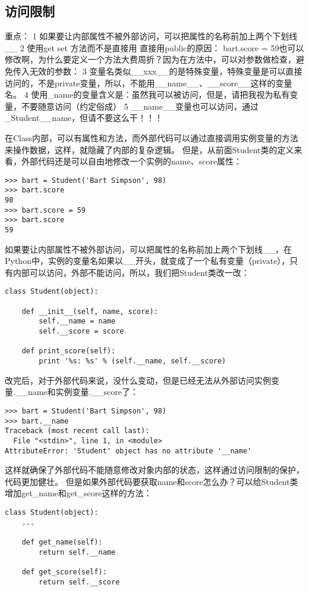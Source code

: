 \documentclass[twoside,11pt]{book}
\begin{document}
\subsection{访问限制}
重点：
1 如果要让内部属性不被外部访问，可以把属性的名称前加上两个下划线\_\_
2 使用get set 方法而不是直接用 直接用public的原因： bart.score = 59也可以修改啊，为什么要定义一个方法大费周折？因为在方法中，可以对参数做检查，避免传入无效的参数：
3 变量名类似\_\_xxx\_\_的是特殊变量，特殊变量是可以直接访问的，不是private变量，所以，不能用\_\_name\_\_、\_\_score\_\_这样的变量名。
4 使用\_name的变量含义是：虽然我可以被访问，但是，请把我视为私有变量，不要随意访问（约定俗成）
5 \_\_name\_\_变量也可以访问，通过\_Student\_\_name，但请不要这么干！！！


在Class内部，可以有属性和方法，而外部代码可以通过直接调用实例变量的方法来操作数据，这样，就隐藏了内部的复杂逻辑。
但是，从前面Student类的定义来看，外部代码还是可以自由地修改一个实例的name、score属性：
\begin{lstlisting}
>>> bart = Student('Bart Simpson', 98)
>>> bart.score
98
>>> bart.score = 59
>>> bart.score
59
\end{lstlisting}

如果要让内部属性不被外部访问，可以把属性的名称前加上两个下划线\_\_，在Python中，实例的变量名如果以\_\_开头，就变成了一个私有变量（private），只有内部可以访问，外部不能访问，所以，我们把Student类改一改：
\begin{lstlisting}
class Student(object):

    def __init__(self, name, score):
        self.__name = name
        self.__score = score

    def print_score(self):
        print '%s: %s' % (self.__name, self.__score)
\end{lstlisting}

改完后，对于外部代码来说，没什么变动，但是已经无法从外部访问实例变量.\_\_name和实例变量.\_\_score了：
\begin{lstlisting}
>>> bart = Student('Bart Simpson', 98)
>>> bart.__name
Traceback (most recent call last):
  File "<stdin>", line 1, in <module>
AttributeError: 'Student' object has no attribute '__name'
\end{lstlisting}

这样就确保了外部代码不能随意修改对象内部的状态，这样通过访问限制的保护，代码更加健壮。
但是如果外部代码要获取name和score怎么办？可以给Student类增加get\_name和get\_score这样的方法：
\begin{lstlisting}
class Student(object):
    ...

    def get_name(self):
        return self.__name

    def get_score(self):
        return self.__score
\end{lstlisting}
\end{document}
